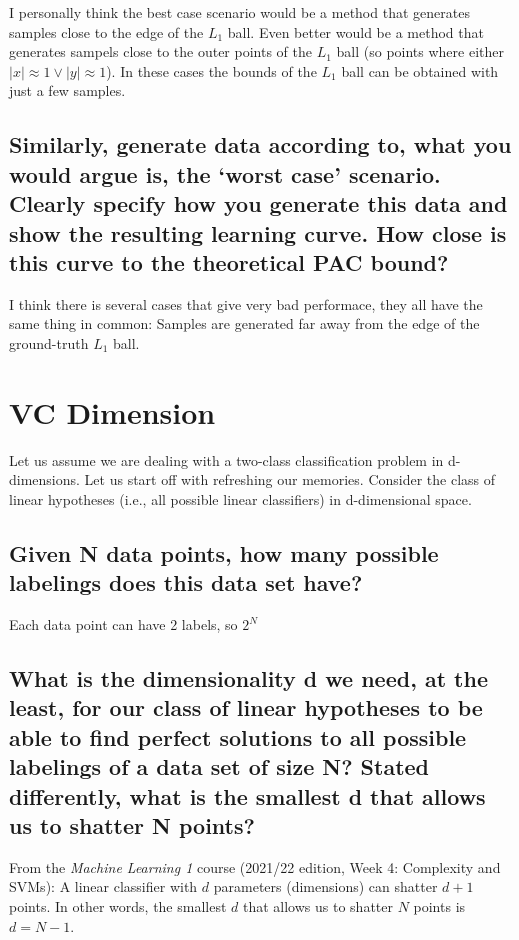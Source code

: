 \documentclass[11pt,a4paper]{article}
\begin{document}
I personally think the best case scenario would be a method that generates samples close to the edge of the $L_1$ ball. Even better would be a method that generates sampels close to the outer points of the $L_1$ ball (so points where either $|x| \approx 1 \lor |y| \approx 1 $). In these cases the bounds of the $L_1$ ball can be obtained with just a few samples.

\subsection{Similarly, generate data according to, what you would argue is, the ‘worst case’ scenario. Clearly specify how you generate this data and show the resulting learning curve. How close is this curve to the theoretical PAC bound?}

I think there is several cases that give very bad performace, they all have the same thing in common: Samples are generated far away from the edge of the ground-truth $L_1$ ball.

\clearpage
\section{VC Dimension}
\label{sec:VC}
Let us assume we are dealing with a two-class classification problem in d-dimensions.
Let us start off with refreshing our memories. Consider the class of linear hypotheses (i.e.,
all possible linear classifiers) in d-dimensional space.

\subsection{Given N data points, how many possible labelings does this data set have?}
\label{sec:2a}
Each data point can have 2 labels, so $2^N$

\subsection{What is the dimensionality d we need, at the least, for our class of linear hypotheses to
be able to find perfect solutions to all possible labelings of a data set of size N? Stated
differently, what is the smallest d that allows us to shatter N points?}
\label{sec:2b}

From the \textit{Machine Learning 1} course (2021/22 edition, Week 4: Complexity and SVMs): A linear classifier with $d$ parameters (dimensions) can shatter $d+1$ points. In other words, the smallest $d$ that allows us to shatter $N$ points is $d = N - 1$. 
\end{document}

